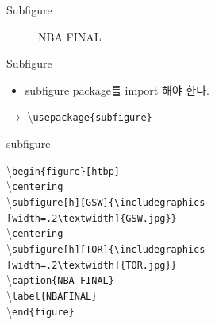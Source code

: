 \documentclass[12pt]{gshs_lecture}
\newenvironment{codeblock}[1]{
	\begin{block}{#1}
		\setstretch{1.0}
		\begin{small}
}{
		\end{small}
	\end{block}
}
\begin{document}
\begin{frame}[t]{Subfigure}
	
	\begin{figure}[h]
		\centering
		\centering
		\caption{NBA FINAL}
		\label{NBAFINAL}
	\end{figure}
	
\end{frame}

\begin{frame}[t]{Subfigure}
	
	\begin{itemize}
		\item subfigure package를 import 해야 한다.
	\end{itemize}

	\hspace{6mm} $\rightarrow$ \textbackslash \texttt{usepackage\{subfigure\}}
	
	\begin{codeblock}{subfigure}
		\textbackslash \texttt{begin\{figure\}[htbp]}\\
		\hspace{6mm} \textbackslash \texttt{centering}\\
		\hspace{6mm} \textbackslash \texttt{subfigure[h][GSW]\{\textbackslash includegraphics\\
			\hspace{6mm} [width=.2\textbackslash textwidth]\{GSW.jpg\}\}}\\
		\hspace{6mm} \textbackslash \texttt{centering}\\
		\hspace{6mm} \textbackslash \texttt{subfigure[h][TOR]\{\textbackslash includegraphics\\
			\hspace{6mm} [width=.2\textbackslash textwidth]\{TOR.jpg\}\}}\\
		\hspace{6mm} \textbackslash \texttt{caption\{NBA FINAL\}}\\
		\hspace{6mm} \textbackslash \texttt{label\{NBAFINAL\}}\\
		\textbackslash \texttt{end\{figure\}}	
	\end{codeblock}
	
\end{frame}
\end{document}
